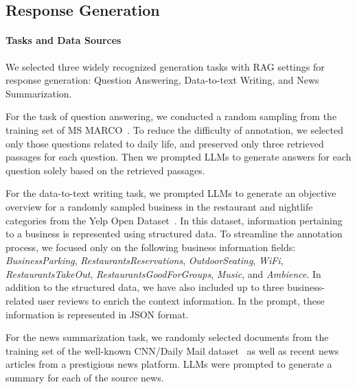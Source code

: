 \documentclass[11pt]{article}
\begin{document}
\subsection{Response Generation}

\paragraph{Tasks and Data Sources} 
We selected three widely recognized generation tasks with RAG settings for response generation: Question Answering, Data-to-text Writing, and News Summarization.

For the task of question answering, we conducted a random sampling from the training set of MS MARCO~\cite{DBLP:journals/corr/NguyenRSGTMD16}. 
To reduce the difficulty of annotation, we selected only those questions related to daily life, and preserved only three retrieved passages for each question.
Then we prompted LLMs to generate answers for each question solely based on the retrieved passages.

For the data-to-text writing task, we prompted LLMs to generate an objective overview for a randomly sampled business in the restaurant and nightlife categories from the Yelp Open Dataset~\cite{yelp2023}.  
In this dataset, information pertaining to a business is represented using structured data.
To streamline the annotation process, we focused only on the following business information fields: \textit{BusinessParking}, \textit{RestaurantsReservations}, \textit{OutdoorSeating}, \textit{WiFi}, \textit{RestaurantsTakeOut}, \textit{RestaurantsGoodForGroups}, \textit{Music}, and \textit{Ambience}. 
In addition to the structured data, we have also included up to three business-related user reviews to enrich the context information.
In the prompt, these information is represented in JSON format.

For the news summarization task, we randomly selected documents from the training set of the well-known CNN/Daily Mail dataset~\cite{see-etal-2017get} as well as recent news articles from a prestigious news platform. 
LLMs were prompted to generate a summary for each of the source news.  
\end{document}
